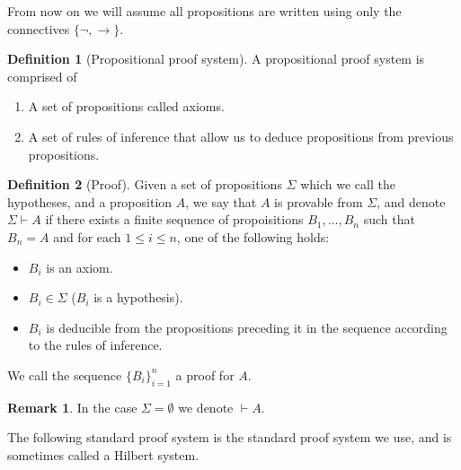 \documentclass[11pt,a4paper]{article}
\theoremstyle{definition}
\newtheorem{definition}{Definition}[section]
\newtheorem{remark}{Remark}[section]
\theoremstyle{plain}
\renewcommand{\implies}{\rightarrow}
\begin{document}
  From now on we will assume all propositions are written using only 
  the connectives $\{\neg, \implies\}$.

  \begin{definition}[Propositional proof system]
    A propositional proof system is comprised of
    \begin{enumerate}
      \item[(1)] A set of propositions called axioms.
      \item[(2)] A set of rules of inference that allow us to deduce
        propositions from previous propositions.
    \end{enumerate}
  \end{definition}

  \begin{definition}[Proof]
    Given a set of propositions $\Sigma$ which we call the hypotheses,
    and a proposition $A$, we say that $A$ is provable from $\Sigma$,
    and denote $\Sigma \vdash A$
    if there exists a finite sequence of propoisitions $B_1,\dots,B_n$
    such that $B_n = A$ and for each $1 \le i \le n$, one of the
    following holds:

    \begin{itemize}
      \item $B_i$ is an axiom.
      \item $B_i \in \Sigma$ ($B_i$ is a hypothesis).
      \item $B_i$ is deducible from the propositions preceding it in the 
        sequence according to the rules of inference.
    \end{itemize}

    We call the sequence $\{B_i\}_{i=1}^{n}$ a proof for $A$.
  \end{definition}
  \begin{remark}
    In the case $\Sigma = \emptyset$ we denote $\vdash A$.
  \end{remark}

  The following standard proof system is the standard proof system we
  use, and is sometimes called a Hilbert system.
\end{document}
